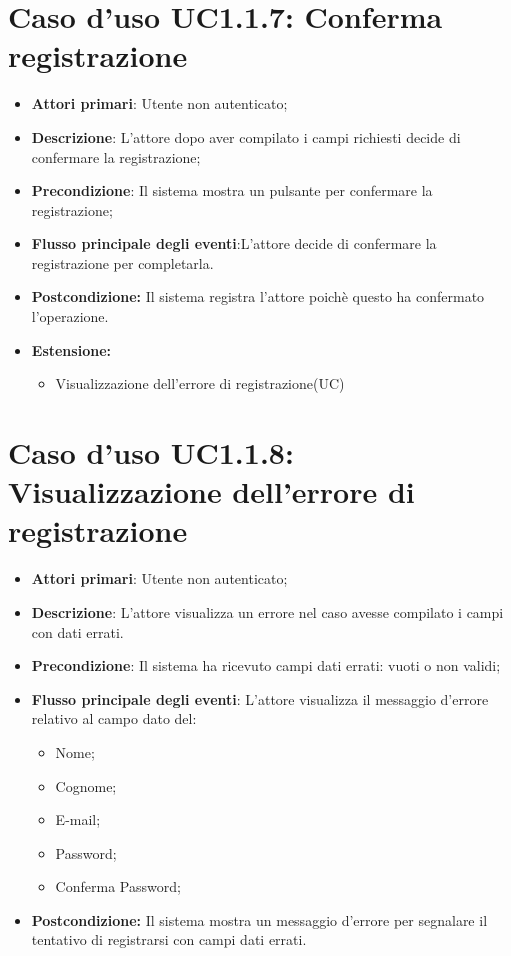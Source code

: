 		\section{Caso d'uso UC1.1.7: Conferma registrazione}
		\begin{itemize}
			\item \textbf{Attori primari}: Utente non autenticato;
			\item \textbf{Descrizione}: L'attore dopo aver compilato i campi richiesti decide di confermare  la registrazione;
			\item \textbf{Precondizione}: Il sistema mostra un pulsante per confermare la registrazione;
			\item \textbf{Flusso principale degli eventi}:L'attore decide di confermare la registrazione per completarla.
			\item \textbf{Postcondizione:} Il sistema registra l'attore poichè questo ha confermato l'operazione.
			\item \textbf{Estensione:}
			\begin{itemize}
				\item Visualizzazione dell'errore di registrazione(UC)
			\end{itemize}
		\end{itemize}
		\section{Caso d'uso UC1.1.8: Visualizzazione dell'errore di registrazione}
		\begin{itemize}
			\item \textbf{Attori primari}: Utente non autenticato;
			\item \textbf{Descrizione}: L'attore visualizza un errore nel caso avesse compilato i campi con dati errati.
			\item \textbf{Precondizione}: Il sistema ha ricevuto campi dati errati: vuoti o non validi;
			\item \textbf{Flusso principale degli eventi}: L'attore visualizza il messaggio d'errore relativo al campo dato  del:
			\begin{itemize}
				\item Nome;
				\item Cognome;
				\item E-mail;
				\item Password;
				\item Conferma Password;
			\end{itemize}
			\item \textbf{Postcondizione:} Il sistema mostra un messaggio d'errore per segnalare il tentativo di registrarsi con campi dati errati.
		\end{itemize}
